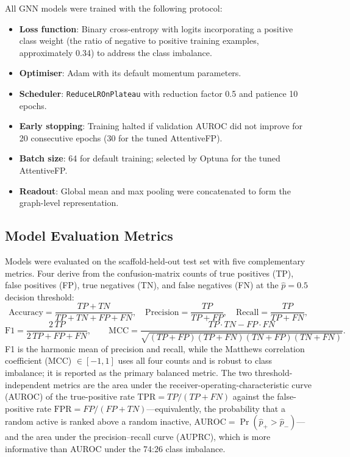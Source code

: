All GNN models were trained with the following protocol:
\begin{itemize}
    \item \textbf{Loss function}: Binary cross-entropy with logits incorporating
          a positive class weight (the ratio of negative to positive training
          examples, approximately 0.34) to address the class imbalance.
    \item \textbf{Optimiser}: Adam with its default momentum parameters.
    \item \textbf{Scheduler}: \texttt{ReduceLROnPlateau} with reduction factor 0.5
          and patience 10 epochs.
    \item \textbf{Early stopping}: Training halted if validation AUROC did not
          improve for 20 consecutive epochs (30 for the tuned AttentiveFP).
    \item \textbf{Batch size}: 64 for default training; selected by Optuna for the
          tuned AttentiveFP.
    \item \textbf{Readout}: Global mean and max pooling were concatenated to form
          the graph-level representation.
\end{itemize}

\subsection{Model Evaluation Metrics}

Models were evaluated on the scaffold-held-out test set with five complementary
metrics. Four derive from the confusion-matrix counts of true positives (TP), false
positives (FP), true negatives (TN), and false negatives (FN) at the $\hat{p}=0.5$
decision threshold:
\begin{equation}
\text{Accuracy}=\frac{TP+TN}{TP+TN+FP+FN},\quad
\text{Precision}=\frac{TP}{TP+FP},\quad
\text{Recall}=\frac{TP}{TP+FN},
\end{equation}
\begin{equation}
\text{F1}=\frac{2\,TP}{2\,TP+FP+FN},\qquad
\text{MCC}=\frac{TP\cdot TN-FP\cdot FN}{\sqrt{(TP+FP)(TP+FN)(TN+FP)(TN+FN)}} .
\end{equation}
F1 is the harmonic mean of precision and recall, while the Matthews correlation
coefficient (MCC) $\in[-1,1]$ uses all four counts and is robust to class imbalance;
it is reported as the primary balanced metric. The two threshold-independent metrics
are the area under the receiver-operating-characteristic curve (AUROC) of the
true-positive rate $\mathrm{TPR}=TP/(TP+FN)$ against the false-positive rate
$\mathrm{FPR}=FP/(FP+TN)$---equivalently, the probability that a random active is
ranked above a random inactive, $\mathrm{AUROC}=\Pr(\hat{p}_{+}>\hat{p}_{-})$---and
the area under the precision--recall curve (AUPRC), which is more informative than
AUROC under the 74:26 class imbalance.

